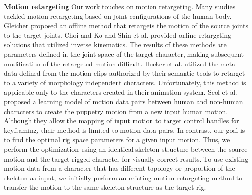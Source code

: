 \textbf{Motion retargeting}
Our work touches on motion retargeting. Many studies tackled motion retargeting based on joint configurations of the human body. Gleicher proposed an offline method that retargets the motion of the source joints to the target joints. Choi and Ko and Shin et al. provided online retargeting solutions that utilized inverse kinematics. The results of these methods are parameters defined in the joint space of the target character, making subsequent modification of the retargeted motion difficult. Hecker et al. utilized the meta data defined from the motion clips authorized by their semantic tools to retarget to a variety of morphology independent characters. Unfortunately, this method is applicable only to the characters created in their animation system. Seol et al. proposed a learning model of motion data pairs between human and non-human characters to create the puppetry motion from a new input human motion. Although they allow the mapping of input motion to target control handles for keyframing, their method is limited to motion data pairs. In contrast, our goal is to find the optimal rig space parameters for a given input motion. Thus, we perform the optimization using an identical skeleton structure between the source motion and the target rigged character for visually correct results. To use existing motion data from a character that has different topology or proportion of the skeleton as input, we initially perform an existing motion retargeting method\cite{palamar2013mastering} to transfer the motion to the same skeleton structure as the target rig.

